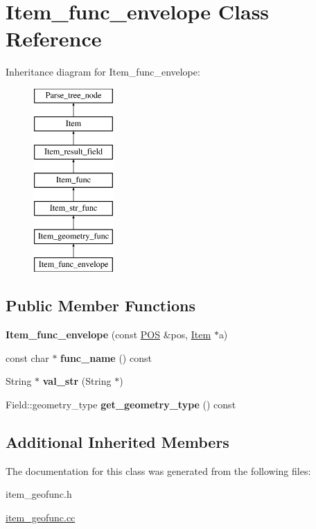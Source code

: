 \hypertarget{classItem__func__envelope}{}\section{Item\+\_\+func\+\_\+envelope Class Reference}
\label{classItem__func__envelope}
Inheritance diagram for Item\+\_\+func\+\_\+envelope\+:\begin{figure}[H]
\begin{center}
\leavevmode
\includegraphics[height=7.000000cm]{classItem__func__envelope}
\end{center}
\end{figure}
\subsection*{Public Member Functions}
\begin{DoxyCompactItemize}
\item 
\mbox{\label{classItem__func__envelope_a70f327f3a5add27a4eb4412a98af0a63}} 
{\bfseries Item\+\_\+func\+\_\+envelope} (const \mbox{\hyperlink{structYYLTYPE}{P\+OS}} \&pos, \mbox{\hyperlink{classItem}{Item}} $\ast$a)
\item 
\mbox{\label{classItem__func__envelope_a84eb0adcf29af1c018ecbbd6138eacd5}} 
const char $\ast$ {\bfseries func\+\_\+name} () const
\item 
\mbox{\label{classItem__func__envelope_ac569fc1e12f923dfcf5440b089c444a1}} 
String $\ast$ {\bfseries val\+\_\+str} (String $\ast$)
\item 
\mbox{\label{classItem__func__envelope_af96b7fae91527a0f7e4141da31f680d9}} 
Field\+::geometry\+\_\+type {\bfseries get\+\_\+geometry\+\_\+type} () const
\end{DoxyCompactItemize}
\subsection*{Additional Inherited Members}


The documentation for this class was generated from the following files\+:\begin{DoxyCompactItemize}
\item 
item\+\_\+geofunc.\+h\item 
\mbox{\hyperlink{item__geofunc_8cc}{item\+\_\+geofunc.\+cc}}\end{DoxyCompactItemize}
